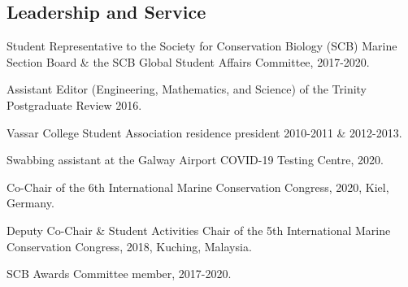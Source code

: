 \documentclass[a4paper]{deedy-resume} %
\begin{document}

\newpage %


\sectionspace


\begin{flushleft}

\sectionspace


\section{Leadership and Service} 


\begin{tightitemize}
\item Student Representative to the Society for Conservation Biology (SCB) Marine Section Board \& the SCB Global Student Affairs Committee, 2017-2020. 
\item Assistant Editor (Engineering, Mathematics, and Science) of the Trinity Postgraduate Review 2016.
\item Vassar College Student Association residence president 2010-2011 \& 2012-2013.
\end{tightitemize}

\sectionspace

\begin{tightitemize}
\item Swabbing assistant at the Galway Airport COVID-19 Testing Centre, 2020.
\item Co-Chair of the 6th International Marine Conservation Congress, 2020, Kiel, Germany.
\item Deputy Co-Chair \& Student Activities Chair of the 5th International Marine Conservation Congress, 2018, Kuching, Malaysia.
\item SCB Awards Committee member, 2017-2020.
\end{tightitemize}


\end{flushleft}
\end{document}
